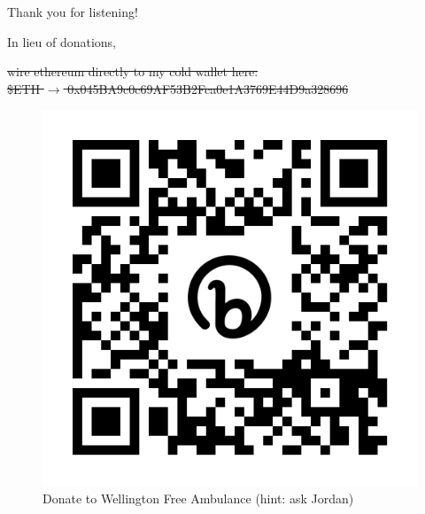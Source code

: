 \documentclass{beamer}
\begin{document}
\begin{frame}{Thank you for listening!}
\vspace{0.2cm}

In lieu of donations,

\sout{
    wire ethereum directly to my cold wallet here: 
    \\ 
    \$ETH $\to$ 0x045BA9c0c69AF53B2Fca0e1A3769E44D9a328696
}

\vspace{1cm}

\begin{figure}
    \centering
    \includegraphics[height=0.3\textheight]{assets/qr/wellington_free_qr.png}
    \caption{Donate to Wellington Free Ambulance (hint: ask Jordan)}
    \label{fig:qr-code}
\end{figure}
\end{frame}
\end{document}
